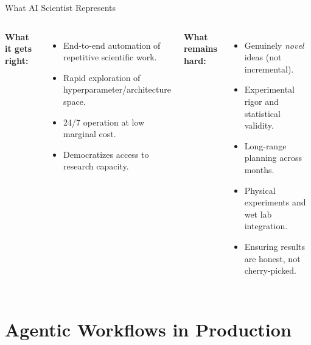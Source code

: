 \documentclass[aspectratio=169,10pt]{beamer}
\begin{document}
\begin{frame}{What AI Scientist Represents}
  \begin{columns}[T]
      \textbf{What it gets right:}
      \begin{itemize}
        \item End-to-end automation of repetitive scientific work.
        \item Rapid exploration of hyperparameter/architecture space.
        \item 24/7 operation at low marginal cost.
        \item Democratizes access to research capacity.
      \end{itemize}
      \textbf{What remains hard:}
      \begin{itemize}
        \item Genuinely \emph{novel} ideas (not incremental).
        \item Experimental rigor and statistical validity.
        \item Long-range planning across months.
        \item Physical experiments and wet lab integration.
        \item Ensuring results are honest, not cherry-picked.
      \end{itemize}
  \end{columns}
\end{frame}

\section{Agentic Workflows in Production}
\end{document}
